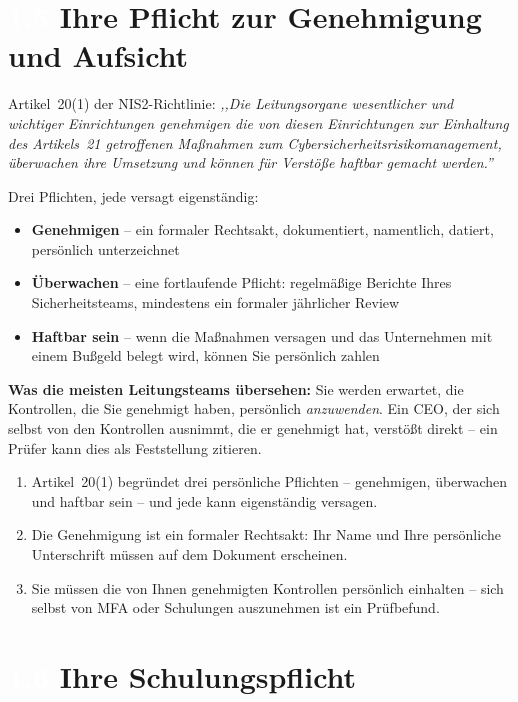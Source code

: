 \documentclass[11pt,a4paper,twoside]{book}
\newcommand{\lessontag}[1]{%
  \texorpdfstring{%
    \setlength{\fboxsep}{3pt}\colorbox{nisd2blue}{\textcolor{white}{\footnotesize\bfseries #1}}\quad%
  }{Lektion #1\ }%
}
\begin{document}
\section{\lessontag{1.5}Ihre Pflicht zur Genehmigung und Aufsicht}

Artikel~20(1) der NIS2-Richtlinie: \textit{,,Die Leitungsorgane wesentlicher und wichtiger Einrichtungen genehmigen die von diesen Einrichtungen zur Einhaltung des Artikels~21 getroffenen Maßnahmen zum Cybersicherheitsrisikomanagement, überwachen ihre Umsetzung und können für Verstöße haftbar gemacht werden.''}

Drei Pflichten, jede versagt eigenständig:
\begin{itemize}
  \item \textbf{Genehmigen} -- ein formaler Rechtsakt, dokumentiert, namentlich, datiert, persönlich unterzeichnet
  \item \textbf{Überwachen} -- eine fortlaufende Pflicht: regelmäßige Berichte Ihres Sicherheitsteams, mindestens ein formaler jährlicher Review
  \item \textbf{Haftbar sein} -- wenn die Maßnahmen versagen und das Unternehmen mit einem Bußgeld belegt wird, können Sie persönlich zahlen
\end{itemize}

\textbf{Was die meisten Leitungsteams übersehen:} Sie werden erwartet, die Kontrollen, die Sie genehmigt haben, persönlich \emph{anzuwenden}. Ein CEO, der sich selbst von den Kontrollen ausnimmt, die er genehmigt hat, verstößt direkt -- ein Prüfer kann dies als Feststellung zitieren.

\begin{keytakeaways}
\begin{enumerate}
  \item Artikel~20(1) begründet drei persönliche Pflichten -- genehmigen, überwachen und haftbar sein -- und jede kann eigenständig versagen.
  \item Die Genehmigung ist ein formaler Rechtsakt: Ihr Name und Ihre persönliche Unterschrift müssen auf dem Dokument erscheinen.
  \item Sie müssen die von Ihnen genehmigten Kontrollen persönlich einhalten -- sich selbst von MFA oder Schulungen auszunehmen ist ein Prüfbefund.
\end{enumerate}
\end{keytakeaways}

\section{\lessontag{1.6}Ihre Schulungspflicht}
\end{document}
